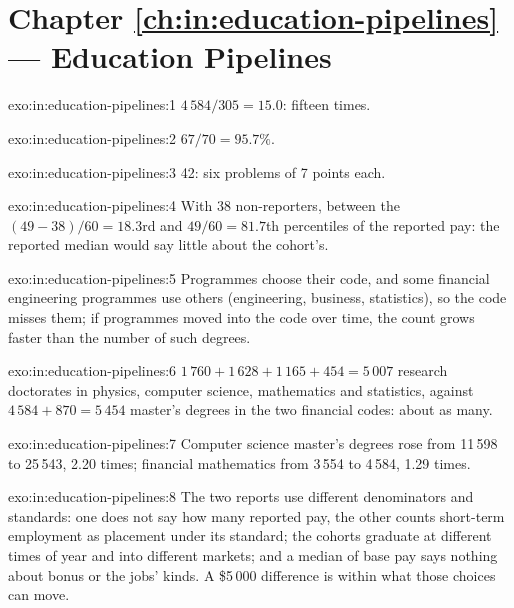 \section*{Chapter \ref{ch:in:education-pipelines} --- Education Pipelines}

\begin{solution}{exo:in:education-pipelines:1}
$4\,584/305=15.0$: fifteen times.
\end{solution}

\begin{solution}{exo:in:education-pipelines:2}
$67/70=95.7\%$.
\end{solution}

\begin{solution}{exo:in:education-pipelines:3}
42: six problems of 7 points each.
\end{solution}

\begin{solution}{exo:in:education-pipelines:4}
With 38 non-reporters, between the $(49-38)/60=18.3$rd and $49/60=81.7$th percentiles of the reported pay: the
reported median would say little about the cohort's.
\end{solution}

\begin{solution}{exo:in:education-pipelines:5}
Programmes choose their code, and some financial engineering programmes use others (engineering, business, statistics),
so the code misses them; if programmes moved into the code over time, the count grows faster than the number of such
degrees.
\end{solution}

\begin{solution}{exo:in:education-pipelines:6}
$1\,760+1\,628+1\,165+454=5\,007$ research doctorates in physics, computer science, mathematics and statistics, against
$4\,584+870=5\,454$ master's degrees in the two financial codes: about as many.
\end{solution}

\begin{solution}{exo:in:education-pipelines:7}
Computer science master's degrees rose from 11\,598 to 25\,543, 2.20 times; financial mathematics from 3\,554 to 4\,584,
1.29 times.
\end{solution}

\begin{solution}{exo:in:education-pipelines:8}
The two reports use different denominators and standards: one does not say how many reported pay, the other counts
short-term employment as placement under its standard; the cohorts graduate at different times of year and into
different markets; and a median of base pay says nothing about bonus or the jobs' kinds. A \$5\,000 difference is within
what those choices can move.
\end{solution}

